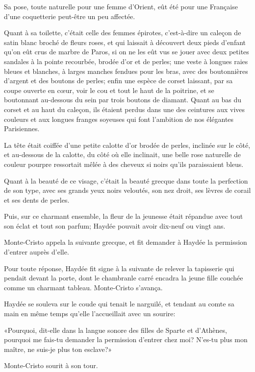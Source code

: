 Sa pose, toute naturelle pour une femme d'Orient, eût été pour une Française d'une coquetterie peut-être un peu affectée. 

Quant à sa toilette, c'était celle des femmes épirotes, c'est-à-dire un caleçon de satin blanc broché de fleurs roses, et qui laissait à découvert deux pieds d'enfant qu'on eût crus de marbre de Paros, si on ne les eût vus se jouer avec deux petites sandales à la pointe recourbée, brodée d'or et de perles; une veste à longues raies bleues et blanches, à larges manches fendues pour les bras, avec des boutonnières d'argent et des boutons de perles; enfin une espèce de corset laissant, par sa coupe ouverte en cœur, voir le cou et tout le haut de la poitrine, et se boutonnant au-dessous du sein par trois boutons de diamant. Quant au bas du corset et au haut du caleçon, ils étaient perdus dans une des ceintures aux vives couleurs et aux longues franges soyeuses qui font l'ambition de nos élégantes Parisiennes. 

La tête était coiffée d'une petite calotte d'or brodée de perles, inclinée sur le côté, et au-dessous de la calotte, du côté où elle inclinait, une belle rose naturelle de couleur pourpre ressortait mêlée à des cheveux si noirs qu'ils paraissaient bleus. 

Quant à la beauté de ce visage, c'était la beauté grecque dans toute la perfection de son type, avec ses grands yeux noirs veloutés, son nez droit, ses lèvres de corail et ses dents de perles. 

Puis, sur ce charmant ensemble, la fleur de la jeunesse était répandue avec tout son éclat et tout son parfum; Haydée pouvait avoir dix-neuf ou vingt ans. 

Monte-Cristo appela la suivante grecque, et fit demander à Haydée la permission d'entrer auprès d'elle. 

Pour toute réponse, Haydée fit signe à la suivante de relever la tapisserie qui pendait devant la porte, dont le chambranle carré encadra la jeune fille couchée comme un charmant tableau. Monte-Cristo s'avança. 

Haydée se souleva sur le coude qui tenait le narguilé, et tendant au comte sa main en même temps qu'elle l'accueillait avec un sourire: 

«Pourquoi, dit-elle dans la langue sonore des filles de Sparte et d'Athènes, pourquoi me fais-tu demander la permission d'entrer chez moi? N'es-tu plus mon maître, ne suis-je plus ton esclave?» 

Monte-Cristo sourit à son tour. 

